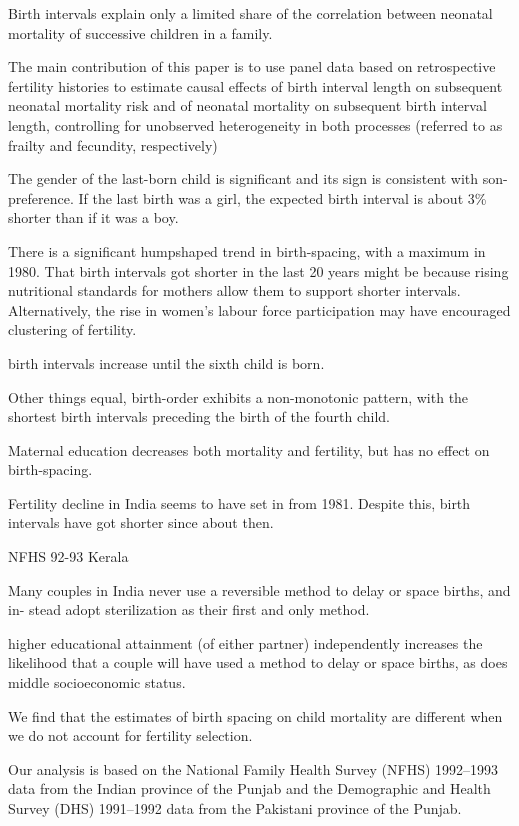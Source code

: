 Birth intervals explain only a limited share of the correlation between
neonatal mortality of successive children in a family.

The main contribution of this paper is to use panel data based on
retrospective fertility histories to estimate causal effects of birth
interval length on subsequent neonatal mortality risk and of neonatal
mortality on subsequent birth interval length, controlling for
unobserved heterogeneity in both processes (referred to as frailty and
fecundity, respectively)


The gender of the last-born child is signiﬁcant and its sign is
consistent with son-preference. If the last birth was a girl, the
expected birth interval is about 3\% shorter than if it was a boy.

There is a signiﬁcant humpshaped trend in birth-spacing, with a maximum
in 1980. That birth intervals got shorter in the last 20 years might be
because rising nutritional standards for mothers allow them to support
shorter intervals. Alternatively, the rise in women’s labour force
participation may have encouraged clustering of fertility.

birth intervals increase until the sixth child is born.

Other things equal, birth-order exhibits a non-monotonic pattern, with
the shortest birth intervals preceding the birth of the fourth child.

Maternal education decreases both mortality and fertility, but has no
effect on birth-spacing.

Fertility decline in India seems to have set in from 1981. Despite this,
birth intervals have got shorter since about then.

\citep{Zavier2000}

NFHS 92-93 Kerala

Many couples in India never use a reversible method to delay or space
births, and in-
stead adopt sterilization as their first and only method.

higher educational attainment (of either partner) independently
increases the likelihood 
that a couple will have used a method to delay or space births, as does
middle 
socioeconomic status. 

\citep{Maitra2008}

We find that the estimates of birth spacing on child mortality are
different when we do not account for fertility selection.

Our analysis is based on the National Family Health Survey (NFHS)
1992–1993 data from the Indian province of the Punjab and the
Demographic and Health Survey (DHS) 1991–1992 data from the Pakistani
province of the Punjab.

